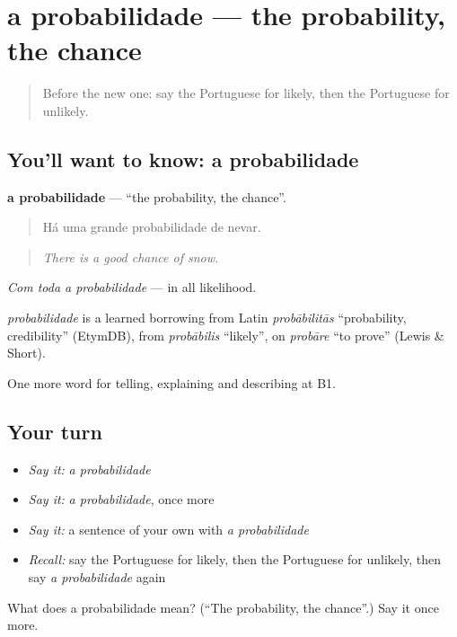 \section[a probabilidade]{a probabilidade — the probability, the chance}

\label{lesson:PT-C373-probabilidade}



\begin{quote}
Before the new one: say the Portuguese for likely, then the Portuguese for unlikely.
\end{quote}

\subsection*{You'll want to know: a probabilidade}
\textbf{a probabilidade} — \textquotedblleft{}the probability, the chance\textquotedblright{}.

\begin{quote}
Há uma grande probabilidade de nevar.
\end{quote}

\begin{quote}
\emph{There is a good chance of snow.}
\end{quote}

\emph{Com toda a probabilidade} — in all likelihood.

\begin{cousinweb}
\emph{probabilidade} is a learned borrowing from Latin \emph{probābilitās} \textquotedblleft{}probability, credibility\textquotedblright{} (EtymDB), from \emph{probābilis} \textquotedblleft{}likely\textquotedblright{}, on \emph{probāre} \textquotedblleft{}to prove\textquotedblright{} (Lewis \& Short).
\end{cousinweb}

\begin{grammarlens}[title={What you've built}]
One more word for telling, explaining and describing at B1.
\end{grammarlens}

\subsection*{Your turn}
\begin{itemize}
\raggedright
  \item \emph{Say it:} \emph{a probabilidade}
  \item \emph{Say it:} \emph{a probabilidade}, once more
  \item \emph{Say it:} a sentence of your own with \emph{a probabilidade}
  \item \emph{Recall:} say the Portuguese for likely, then the Portuguese for unlikely, then say \emph{a probabilidade} again
\end{itemize}

\begin{tcolorbox}[breakable,colback=teal!4,colframe=teal!35!black,title={Before you move on}]
What does a probabilidade mean? (\textquotedblleft{}The probability, the chance\textquotedblright{}.) Say it once more.
\end{tcolorbox}
